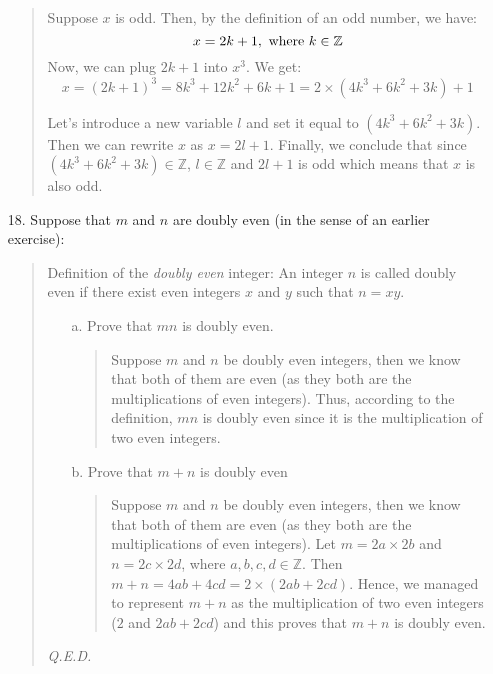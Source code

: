 \documentclass[12pt, a4paper]{article}                      %
\begin{document}
\begin{enumerate}
\begin{quote}
Suppose $x$ is odd. Then, by the definition of an odd number, we have:
$$x = 2k + 1, \ \textnormal{where} \ k \in \mathbb{Z}$$
Now, we can plug $2k + 1$ into $x^3$. We get:
$$
x = (2k + 1)^3 = 8k^3 + 12k^2 + 6k + 1 = 2 \times (4k^3 + 6k^2 + 3k) + 1
$$

Let's introduce a new variable $l$ and set it equal to $(4k^3 + 6k^2 + 3k)$.
Then we can rewrite $x$ as $x = 2l + 1$. Finally, we conclude that since
$(4k^3 + 6k^2 + 3k) \in \mathbb{Z}$, $l \in \mathbb{Z}$ and $2l + 1$ is odd which
means that $x$ is also odd.
\end{quote}

\item[18.]
Suppose that $m$ and $n$ are doubly even (in the sense of an earlier exercise):
\begin{quote}
Definition of the \textit{doubly even} integer: An integer $n$ is called doubly even if there exist even integers $x$ and $y$ such that $n = xy$.\\

\begin{itemize}
\item[a.]
Prove that $mn$ is doubly even.
\begin{quote}
Suppose $m$ and $n$ be doubly even integers, then we know that both of them are even (as they both are the multiplications of even integers).
Thus, according to the definition, $mn$ is doubly even since it is the multiplication of two even integers.
\end{quote}

\item[b.]
Prove that $m + n$ is doubly even
\begin{quote}
Suppose $m$ and $n$ be doubly even integers, then we know that both of them are even (as they both are the multiplications of even integers).
Let $m = 2a \times 2b$ and $n = 2c \times 2d$, where $a,b,c,d \in \mathbb{Z}$. Then $m + n = 4ab + 4cd = 2 \times (2ab + 2cd)$. Hence, we managed to represent
$m + n$ as the multiplication of two even integers ($2$ and $2ab + 2cd$) and this proves that $m + n$ is doubly even.
\end{quote}
\end{itemize}
\begin{flushright}
\textit{Q.E.D.}
\end{flushright}
\end{quote}


\end{enumerate}
\end{document}
